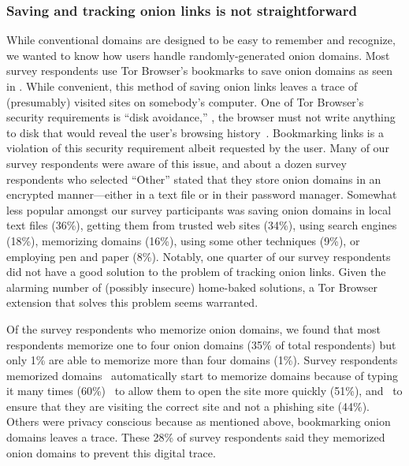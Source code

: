 \subsubsection{Saving and tracking onion links is not straightforward}
While conventional domains are designed to be easy to remember and recognize, we wanted to know how users handle randomly-generated onion domains. Most survey respondents use Tor Browser's bookmarks to save onion domains as seen in .  While
convenient, this method of saving onion links leaves a trace of (presumably) visited sites on somebody's
computer.  One of Tor Browser's security requirements is ``disk avoidance,''
\ie, the browser must not write anything to disk that would reveal the user's
browsing history~\cite[\S~2.1]{Perry2017a}.  Bookmarking links is a violation of
this security requirement albeit requested by the user.  Many of our survey respondents
were aware of this issue, and about a dozen survey respondents who selected ``Other''
stated that they store onion domains in an encrypted manner---either in a text
file or in their password manager.  Somewhat less popular amongst our survey participants was saving onion
domains in local text files (36\%), getting them from trusted web sites (34\%),
using search engines (18\%), memorizing domains (16\%), using some other
techniques (9\%), or employing pen and paper (8\%).  Notably, one quarter of our survey
respondents did not have a good solution to the problem of tracking onion links.  Given the alarming
number of (possibly insecure) home-baked solutions, a Tor Browser extension that
solves this problem seems warranted.

Of the survey respondents who memorize onion domains, we found that most respondents
memorize one to four onion domains (35\% of total respondents) but only 1\% are able to memorize more than four domains (1\%).   Survey respondents memorized domains \first~automatically start to memorize domains
because of typing it many times (60\%)
\second~to allow them to open the site more
quickly (51\%), and \third~to ensure that they are visiting the correct site and
not a phishing site (44\%). Others were privacy conscious because as mentioned above,
bookmarking onion domains leaves a trace. These 28\% of survey respondents said
they memorized onion domains to prevent this digital trace.

